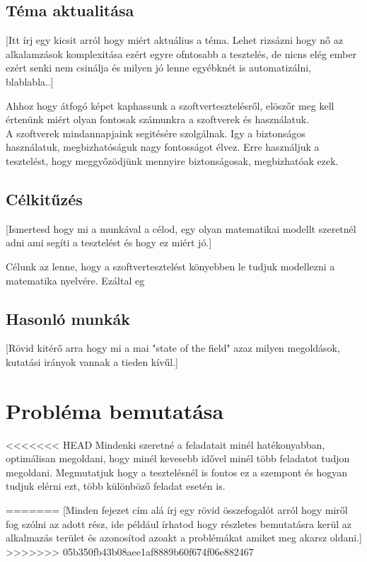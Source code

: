\documentclass[12pt]{article}
\begin{document}
\subsection{Téma aktualitása}
[Itt írj egy kicsit arról hogy miért aktuálius a téma. Lehet rizsázni hogy nő az alkalamzások komplexitása ezért egyre ofntosabb a tesztelés, de nicns elég ember ezért senki nem csinálja és milyen jó lenne egyébknét is automatizálni, blablabla..]

Ahhoz hogy átfogó képet kaphassunk a szoftvertesztelésről, elöszőr meg kell értenünk miért olyan fontosak számunkra a szoftverek és használatuk.\\ 
A szoftverek mindannapjaink segitésére szolgálnak. Igy a biztonságos használatuk, megbizhatóságuk nagy fontosságot élvez. Erre használjuk a tesztelést, hogy meggyőzödjünk mennyire biztonságosak, megbizhatóak ezek.\\





\subsection{Célkitűzés}
[Ismertesd hogy mi a munkával a célod,  egy olyan matematikai modellt szeretnél adni ami segíti a tesztelést és hogy ez miért jó.]

Célunk az lenne, hogy a szoftvertesztelést könyebben le tudjuk modellezni a matematika nyelvére. Ezáltal eg

\subsection{Hasonló munkák}
[Rövid kitérő arra hogy mi a mai "state of the field" azaz milyen megoldások, kutatási irányok vannak a tieden kívűl.]




\section{Probléma bemutatása}

<<<<<<< HEAD
Mindenki szeretné a feladatait minél hatékonyabban, optimálisan megoldani, hogy minél kevesebb idővel minél több feladatot tudjon megoldani. Megmutatjuk hogy a tesztelésnél is fontos ez a szempont és hogyan tudjuk elérni ezt, több különböző feladat esetén is.

=======
[Minden fejezet cím alá írj egy rövid összefogalót arról hogy miről fog szólni az adott rész, ide például írhatod hogy részletes bemutatásra kerül az alkalmazás terület és azonosítod azoakt a problémákat amiket meg akarsz oldani.]
>>>>>>> 05b350fb43b08aee1af8889b60f674f06e882467
\end{document}
